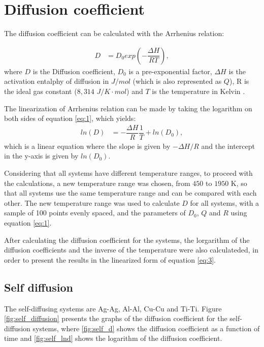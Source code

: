 \clearpage
\section{Diffusion coefficient}

The diffusion coefficient can be calculated with the Arrhenius relation:

\begin{align}
    \label{eq:1}
    D&=D_0 exp\left(-\dfrac{\Delta H}{RT}\right),
\end{align}
where $D$ is the Diffusion coefficient, $D_0$ is a pre-exponential factor, $\Delta H$ is the activation entalphy of diffusion in $J/mol$ (which is also represented as $Q$), R is the ideal gas constant ($8,314$ $J/K\cdot mol$) and $T$ is the temperature in Kelvin \citep{diff}. 

The linearization of Arrhenius relation can be made by taking the logarithm on both sides of equation \eqref{eq:1}, which yields:
\begin{align}
  \label{eq:2}
  ln(D)&=-\dfrac{\Delta H}{R}\dfrac{1}{T} + ln(D_0),
\end{align}
which is a linear equation where the slope is given by $-\Delta H/R$ and the intercept in the y-axis is given by $ln(D_0)$.

Considering that all systems have different temperature ranges, to proceed with the calculations, a new temperature range was chosen, from $450$ to $1950$ K, so that all systems use the same temperature range and can be compared with each other. The new temperature range was used to calculate $D$ for all systems, with a sample of 100 points evenly spaced, and the parameters of $D_0$, $Q$ and $R$ using equation \eqref{eq:1}.

After calculating the diffusion coefficient for the systems, the lorgarithm of the diffusion coefficients and the inverse of the temperature were also calculateded, in order to present the results in the linearized form of equation \eqref{eq:3}.

\subsection{Self diffusion}

The self-diffusing systems are Ag-Ag, Al-Al, Cu-Cu and Ti-Ti. Figure \ref{fig:self_diffusion} presents the graphs of the diffusion coefficient for the self-diffusion systems, where \ref{fig:self_d} shows the diffusion coefficient as a function of time and \ref{fig:self_lnd} shows the logarithm of the diffusion coefficient.

